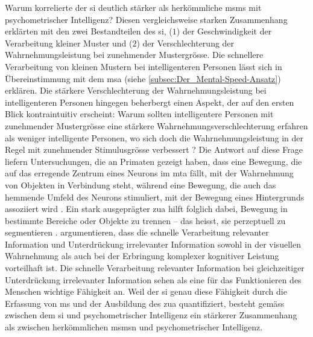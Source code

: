 \documentclass[11pt, twoside, a4paper]{book}		%
\begin{document}
Warum korrelierte der \gls{si} deutlich stärker \citep[Studie 1: $r~=~.64$ und Studie~2: $r~=~.71$;][]{Melnick2013} als herkömmliche \glspl{msm} \citep[$r~=~-.24$;][]{Sheppard2008} mit  psychometrischer Intelligenz? Diesen vergleichsweise starken Zusammenhang erklärten \citet{Melnick2013} mit den zwei Bestandteilen des \gls{si}, ($1$) der Geschwindigkeit der Verarbeitung kleiner Muster und ($2$) der Verschlechterung der Wahrnehmungsleistung bei zunehmender Mustergrösse. Die schnellere Verarbeitung von kleinen Mustern bei intelligenteren Personen lässt sich in Übereinstimmung mit dem \gls{msa} (siehe \autoref{subsec:Der_Mental-Speed-Ansatz}) erklären. Die stärkere Verschlechterung der Wahrnehmungsleistung bei intelligenteren Personen hingegen beherbergt einen Aspekt, der auf den ersten Blick kontraintuitiv erscheint: 
Warum sollten intelligentere Personen mit zunehmender Mustergrösse eine stärkere Wahrnehmungsverschlechterung erfahren als weniger intelligente Personen, wo sich doch die Wahrnehmungsleistung in der Regel mit zunehmender Stimulusgrösse verbessert \citep{Anderson1987, Henrie2001}? Die Antwort auf diese Frage liefern Untersuchungen, die an Primaten gezeigt haben, dass eine Bewegung, die auf das erregende Zentrum eines Neurons im \gls{mta} fällt, mit der Wahrnehmung von Objekten in Verbindung steht, während eine Bewegung, die auch das hemmende Umfeld des Neurons stimuliert, mit der Bewegung eines Hintergrunds assoziiert wird \citep{Born2000, Churan2008, Regan2000}. 
Ein stark ausgeprägter \gls{zua} hilft folglich dabei, Bewegung in bestimmte Bereiche oder Objekte zu trennen -- das heisst, sie perzeptuell zu segmentieren \citep{Braddick1993}.
\citeauthor{Melnick2013} argumentieren, dass die schnelle Verarbeitung relevanter Information und Unterdrückung irrelevanter Information sowohl in der visuellen Wahrnehmung \citep[Trennung zwischen bewegtem Objekt und Hintergrund; siehe][]{Born2000, Churan2008} als auch bei der Erbringung komplexer kognitiver Leistung \citep[Aufmerksamkeitslenkung auf relevante Information und Unterdrückung von Interferenzen; siehe][]{Burgess2011, Engle1999, Zanto2009} vorteilhaft ist.
Die schnelle Verarbeitung relevanter Information bei gleichzeitiger Unterdrückung irrelevanter Information sehen \citeauthor{Melnick2013} als eine für das Funktionieren des Menschen wichtige Fähigkeit an. Weil der \gls{si} genau diese Fähigkeit durch die Erfassung von \gls{ms} und der Ausbildung des \gls{zua} quantifiziert, besteht gemäss \citeauthor{Melnick2013} zwischen dem \gls{si} und psychometrischer Intelligenz ein stärkerer Zusammenhang als zwischen herkömmlichen \glspl{msm}n und psychometrischer Intelligenz.
\end{document}
